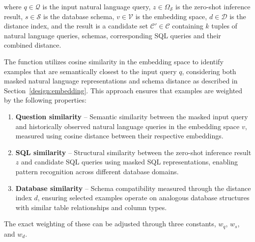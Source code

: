 where $q \in \mathcal{Q}$ is the input natural language query, $z \in \Omega_{\mathcal{S}}$
is the zero-shot inference result, $s \in \mathcal{S}$ is the database schema,
$v \in \mathcal{V}$ is the embedding space, $d \in \mathcal{D}$ is the distance index,
and the result is a candidate set $\mathcal{C}' \in \mathcal{C}$ containing $k$
tuples of natural language queries, schemas, corresponding SQL queries and their
combined distance.

The function utilizes cosine similarity in the embedding space to identify examples
that are semantically closest to the input query $q$, considering both masked natural
language representations and schema distance as described in Section~\ref{design:embedding}.
This approach ensures that examples are weighted by the following properties:

\begin{enumerate}
    \item \textbf{Question similarity} – Semantic similarity between the masked input
        query and historically observed natural language queries in the embedding space
        $v$, measured using cosine distance between their respective embeddings.
    \item \textbf{SQL similarity} – Structural similarity between the zero-shot inference
        result $z$ and candidate SQL queries using masked SQL representations, enabling
        pattern recognition across different database domains.
    \item \textbf{Database similarity} – Schema compatibility measured through the distance
        index $d$, ensuring selected examples operate on analogous database
        structures with similar table relationships and column types.
\end{enumerate}

The exact weighting of these can be adjusted through three constants, $w_q$, $w_s$, and $w_d$.

